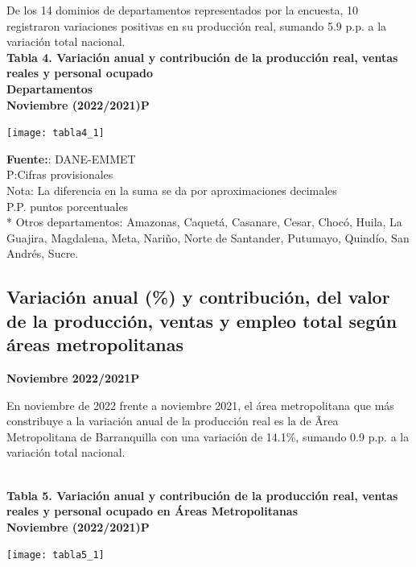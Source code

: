 \documentclass[
]{article}
\begin{document}
De los 14 dominios de departamentos representados por la encuesta, 10
registraron variaciones positivas en su producción real, sumando 5.9
p.p. a la variación total nacional.\\

\textbf{Tabla 4. Variación anual y contribución de la producción real, ventas reales y personal ocupado}\\
\textbf{Departamentos}\\
\textbf{Noviembre (2022/2021)P}

\begin{center}\texttt{[image: tabla4\_1]} \end{center}

\textbf{Fuente:}: DANE-EMMET\\
P:Cifras provisionales\\
Nota: La diferencia en la suma se da por aproximaciones decimales\\
P.P. puntos porcentuales\\
* Otros departamentos: Amazonas, Caquetá, Casanare, Cesar, Chocó, Huila,
La Guajira, Magdalena, Meta, Nariño, Norte de Santander, Putumayo,
Quindío, San Andrés, Sucre.

\hypertarget{variaciuxf3n-anual-y-contribuciuxf3n-del-valor-de-la-producciuxf3n-ventas-y-empleo-total-seguxfan-uxe1reas-metropolitanas}{%
\subsection{Variación anual (\%) y contribución, del valor de la
producción, ventas y empleo total según áreas
metropolitanas}\label{variaciuxf3n-anual-y-contribuciuxf3n-del-valor-de-la-producciuxf3n-ventas-y-empleo-total-seguxfan-uxe1reas-metropolitanas}}

\textbf{Noviembre 2022/2021P}

En noviembre de 2022 frente a noviembre 2021, el área metropolitana que
más constribuye a la variación anual de la producción real es la de Ãrea
Metropolitana de Barranquilla con una variación de 14.1\%, sumando 0.9
p.p. a la variación total nacional.\\
\strut \\
\textbf{Tabla 5. Variación anual y contribución de la producción real,
ventas reales y personal ocupado en Áreas Metropolitanas}\\
\textbf{Noviembre (2022/2021)P}

\begin{center}\texttt{[image: tabla5\_1]} \end{center}
\end{document}
